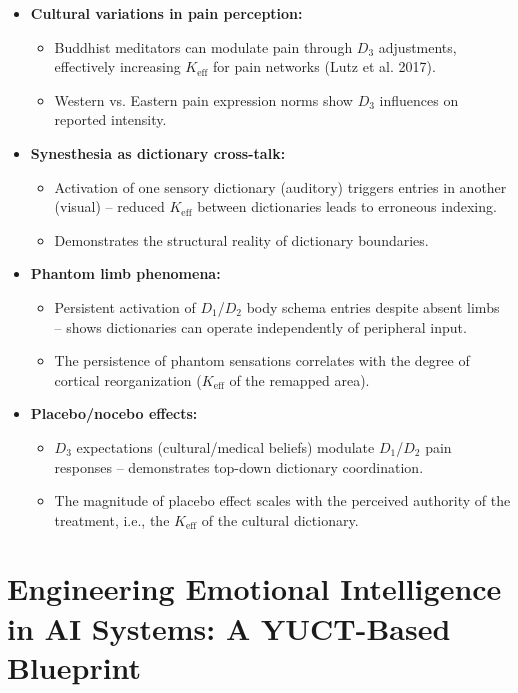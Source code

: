 \documentclass[12pt,a4paper]{article}
\newcommand{\eff}{\mathrm{eff}}
\newcommand{\Ke}{K_{\eff}}
\begin{document}
	\begin{itemize}
		\item \textbf{Cultural variations in pain perception:}
		\begin{itemize}
			\item Buddhist meditators can modulate pain through $D_3$ adjustments, effectively increasing $\Ke$ for pain networks (Lutz et al. 2017).
			\item Western vs. Eastern pain expression norms show $D_3$ influences on reported intensity.
		\end{itemize}
		
		\item \textbf{Synesthesia as dictionary cross-talk:}
		\begin{itemize}
			\item Activation of one sensory dictionary (auditory) triggers entries in another (visual) – reduced $\Ke$ between dictionaries leads to erroneous indexing.
			\item Demonstrates the structural reality of dictionary boundaries.
		\end{itemize}
		
		\item \textbf{Phantom limb phenomena:}
		\begin{itemize}
			\item Persistent activation of $D_1$/$D_2$ body schema entries despite absent limbs – shows dictionaries can operate independently of peripheral input.
			\item The persistence of phantom sensations correlates with the degree of cortical reorganization ($\Ke$ of the remapped area).
		\end{itemize}
		
		\item \textbf{Placebo/nocebo effects:}
		\begin{itemize}
			\item $D_3$ expectations (cultural/medical beliefs) modulate $D_1$/$D_2$ pain responses – demonstrates top-down dictionary coordination.
			\item The magnitude of placebo effect scales with the perceived authority of the treatment, i.e., the $\Ke$ of the cultural dictionary.
		\end{itemize}
	\end{itemize}
	
	\section{Engineering Emotional Intelligence in AI Systems: A YUCT-Based Blueprint}
	
\end{document}
